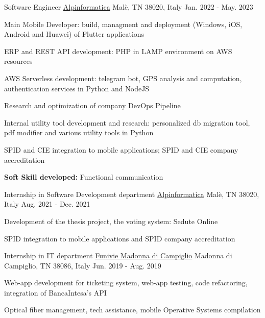 \begin{cventries}
  \cventry
    {Software Engineer} %
    {\href{https://www.alpinformatica.com/}{Alpinformatica}} %
    {Malè, TN 38020, Italy} %
    {Jan. 2022 - May. 2023} %
    {
      \begin{cvitems} %
        \item {Main Mobile Developer: build, managment and deployment (Windows, iOS, Android and Huawei) of Flutter applications}
        \item {ERP and REST API development: PHP in LAMP environment on AWS resources}
        \item {AWS Serverless development: telegram bot, GPS analysis and computation, authentication services in Python and NodeJS}
        \item {Research and optimization of company DevOps Pipeline}
        \item {Internal utility tool development and research: personalized db migration tool, pdf modifier and various utility tools in Python}
        \item {SPID and CIE integration to mobile applications; SPID and CIE company accreditation}
        \item {\textbf{Soft Skill developed:} Functional communication}
      \end{cvitems}
    }

  \cventry
    {Internship in Software Development department} %
    {\href{https://www.alpinformatica.com/}{Alpinformatica}} %
    {Malè, TN 38020, Italy} %
    {Aug. 2021 - Dec. 2021} %
    {
      \begin{cvitems} %
        \item {Development of the thesis project, the voting system: Sedute Online}
        \item {SPID integration to mobile applications and SPID company accreditation}
      \end{cvitems}
    }
\cventry
{Internship in IT department} %
{\href{https://www.funiviecampiglio.it}{Funivie Madonna di Campiglio}} %
{Madonna di Campiglio, TN 38086, Italy} %
{Jun. 2019 - Aug. 2019} %
{
  \begin{cvitems} %
    \item {Web-app development for ticketing system, web-app testing, code refactoring, integration of BancaIntesa's API}
    \item {Optical fiber management, tech assistance, mobile Operative Systems compilation}
  \end{cvitems}
  }


\end{cventries}
